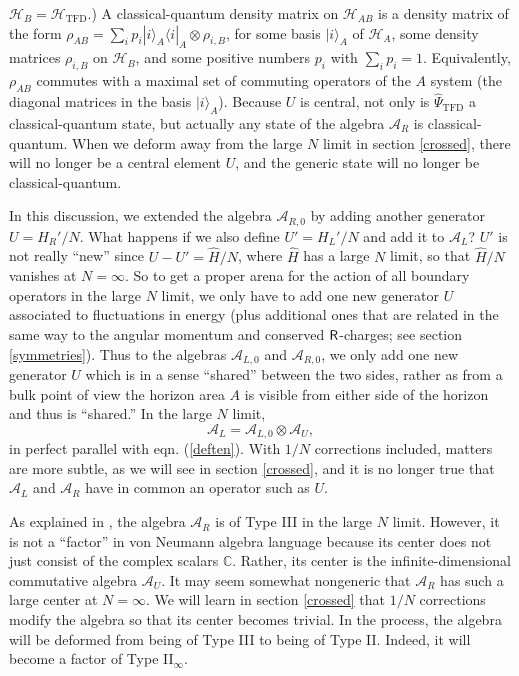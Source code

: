 \documentclass[11pt,a4paper]{article}
\def\be{\begin{equation}}
\def\ee{\end{equation}}
\def\h{\widehat}
\def\A{{\mathcal A}}
\def\C{{\mathbb C}}
\def\U{{ U}}
\def\h{\widehat}
\def\la{\langle}
\def\ra{\rangle}
\def\H{{\mathcal H}}
\def\TFD{{\mathrm{TFD}}}
\def\Rr{{\sf R}}
\begin{document}
$\H_B=\H_\TFD$.)  A classical-quantum  density matrix on $\H_{AB}$ is a density matrix of the form $\rho_{AB}=\sum_i p_i |i\ra_A\la i|_A\otimes \rho_{i,B}$, for some basis $|i\ra_A$ of $\H_A$,
some density matrices $\rho_{i,B}$ on $\H_B$, and some positive numbers $p_i$ with $\sum_i p_i=1$.    Equivalently, $\rho_{AB}$ commutes with
a maximal set of commuting operators of the $A$ system (the diagonal matrices in the basis $|i\ra_A$).  Because $\U$ is central, not only is $\h\Psi_\TFD$ a classical-quantum state, but actually any
state of the algebra $\A_R$ is classical-quantum.   When we deform away from the large $N$ limit in section \ref{crossed}, there will no longer be a 
 central element $\U$,  and the generic state will no longer be classical-quantum.


In this discussion, we extended the algebra $\A_{R,0}$ by adding another generator $\U=H_R'/N$.   What happens if we also define $\U'=H_L'/N$ and add it to $\A_L$? $\U'$ is not really ``new''
since $\U-\U'=\h H/N$, where $\h H$ has a large $N$ limit, so that  $\h H/N$ vanishes at $N=\infty$.
   So to get a proper arena for the action of all boundary operators in the large $N$ limit, 
we only have to add one new generator $\U$ associated to fluctuations in energy 
(plus additional ones that are related in the same way to the angular momentum and conserved $\Rr$-charges; see section \ref{symmetries}).  
Thus to the algebras $\A_{L,0}$ and $\A_{R,0}$, we only add one new generator $\U$ which is in a sense ``shared'' between the two sides, rather as from a bulk
point of view the horizon area $A$ is visible from either side of the horizon and thus is ``shared.'' 
In the large $N$ limit,
\be\label{weften}\A_L=\A_{L,0}\otimes \A_\U,\ee
in perfect parallel with eqn. (\ref{deften}).  With $1/N$ corrections included, matters are more subtle, as we will see in section \ref{crossed},
 and it is no longer true that $\A_L$ and $\A_R$ have in common an
operator such as $U$.


As explained in \cite{LL,LL2}, the algebra $\A_R$ is of Type III in the large $N$ limit.   However, it is not a ``factor'' in von Neumann algebra language
because its center does not just consist of the complex scalars $\C$.  Rather, its 
center is the infinite-dimensional commutative algebra $\A_\U$.   It may seem somewhat nongeneric that $\A_R$ has such a large center at $N=\infty$.
We will learn in section \ref{crossed}  that $1/N$ corrections modify the algebra so that its center becomes trivial.  In the process, the algebra
will be deformed from being of Type III to being of Type II.   Indeed, it will become a factor of Type II$_\infty$.
\end{document}
